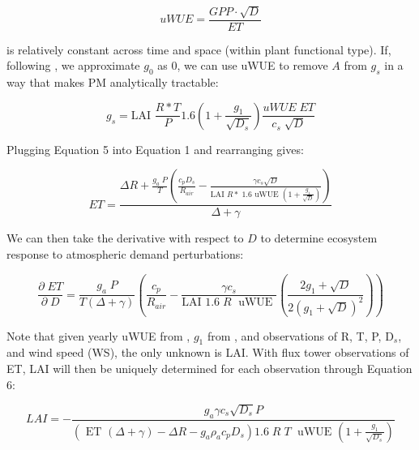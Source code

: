 \documentclass[draft,linenumbers]{agujournal}
\begin{document}
\begin{linenomath*}
  \begin{equation}
uWUE = \frac{GPP \cdot \sqrt{D}}{ET}
  \end{equation}
\end{linenomath*}
is relatively constant across time and space (within plant functional type). If, following \citet{Lin_2015}, we approximate $g_0$ as $0$, we can use uWUE to remove $A$ from $g_s$ in a way that makes PM analytically tractable:

\begin{linenomath*}
  \begin{equation}
  g_s = \text{LAI } \frac{R* T}{P} 1.6 \left(1 + \frac{g_1}{\sqrt{D_{s}}}\right) \frac{uWUE \; ET}{c_s \; \sqrt{D}}
  \end{equation}
\end{linenomath*}

Plugging Equation 5 into Equation 1 and rearranging gives:

\begin{linenomath*}
  \begin{equation}
  ET = \frac{\Delta R + \frac{g_a\; P}{T} \left( \frac{ c_p D_{s}}{R_{air}} - \frac{\gamma c_s \sqrt{D} }{\text{LAI } R* \; 1.6 \text{ uWUE } (1 + \frac{g_1}{\sqrt{D}})} \right) }{ \Delta + \gamma}
  \end{equation}
\end{linenomath*}

We can then take the derivative with respect to $D$ to determine ecosystem response to atmospheric demand perturbations:

\begin{linenomath*}
  \begin{equation}
    \frac{\partial \;  ET}{\partial \; D} = \frac{g_a \; P}{T(\Delta + \gamma)}   \left(\frac{ c_p}{R_{air}} - \frac{\gamma c_s }{\text{LAI }1.6 \; R\; \text{ uWUE }} \left( \frac{2 g_1 + \sqrt{D}}{2 (g_1 + \sqrt{D})^2}\right) \right)
    \label{d_et}
  \end{equation}
\end{linenomath*}
Note that given yearly uWUE from \citet{Zhou_2015}, $g_1$ from \citet{Lin_2015} \citep[as presented in ][]{Franks_2017}, and observations of R, T, P, D$_s$, and wind speed (WS), the only unknown is LAI. With flux tower observations of ET, LAI will then be uniquely determined for each observation through Equation 6:

\begin{linenomath*}
  \begin{equation}
    LAI  = - \frac{g_a \gamma c_s \sqrt{D_s} P }{ \left(\text{ ET } ( \Delta + \gamma) - \Delta R - g_a \rho_a c_p D_{s}\right) 1.6 \; R\; T\; \text{ uWUE } (1 + \frac{g_1}{\sqrt{D_s}})}
    \label{lai}
  \end{equation}
\end{linenomath*}
\end{document}
